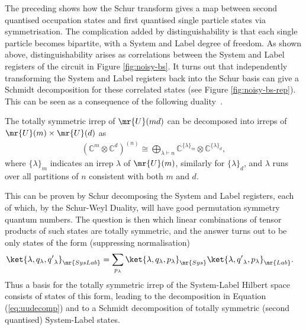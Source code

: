 The preceding shows how the Schur transform gives a map between second quantised occupation states and first quantised single particle states via symmetrisation.
The complication added by distinguishability is that each single particle becomes bipartite, with a System and Label degree of freedom.
As shown above, distinguishability arises as correlations between the System and Label registers of the circuit in Figure \ref{fig:noisy-bs}.
It turns out that independently transforming the System and Label registers back into the Schur basis can give a Schmidt decomposition for these correlated states (see Figure \ref{fig:noisy-bs-rep}).
This can be seen as a consequence of the following duality~\cite{goodman2009, rowe2012}.
\begin{theorem}\label{thm:unitary-unitary}
The totally symmetric irrep of $\mr{U}(md)$ can be decomposed into irreps of $\mr{U}(m) \times \mr{U}(d)$ as
\begin{align}\label{eq:uudecomp}
(\mathbb{C}^{m} \otimes \mathbb{C}^{d})^{(n)} \cong \bigoplus_{\lambda\vdash n} \mathbb{C}^{\{\lambda\}_m} \otimes \mathbb{C}^{\{\lambda\}_d} ,
\end{align}
where $\{\lambda\}_m$ indicates an irrep $\lambda$ of $\mr{U}(m)$, similarly for $\{\lambda\}_d$, and $\lambda$ runs over all partitions of $n$ consistent with both $m$ and $d$.
\end{theorem}
This can be proven by Schur decomposing the System and Label registers, each of which, by the Schur-Weyl Duality, will have good permutation symmetry quantum numbers.
The question is then which linear combinations of tensor products of such states are totally symmetric, and the answer turns out to be only states of the form (suppressing normalisation)~\cite{hamermesh1962}
\begin{align}\label{eq:symSL}
\ket{\lambda, q_\lambda, {q'}_\lambda}_\mr{SysLab} &=  \sum_{p_\lambda} \ket{\lambda, q_\lambda, p_\lambda}_\mr{Sys} \ket{\lambda, {q'}_\lambda, p_\lambda}_\mr{Lab} .
\end{align}
Thus a basis for the totally symmetric irrep of the System-Label Hilbert space consists of states of this form, leading to the decomposition in Equation (\ref{eq:uudecomp}) and to a Schmidt decomposition of totally symmetric (second quantised) System-Label states.

